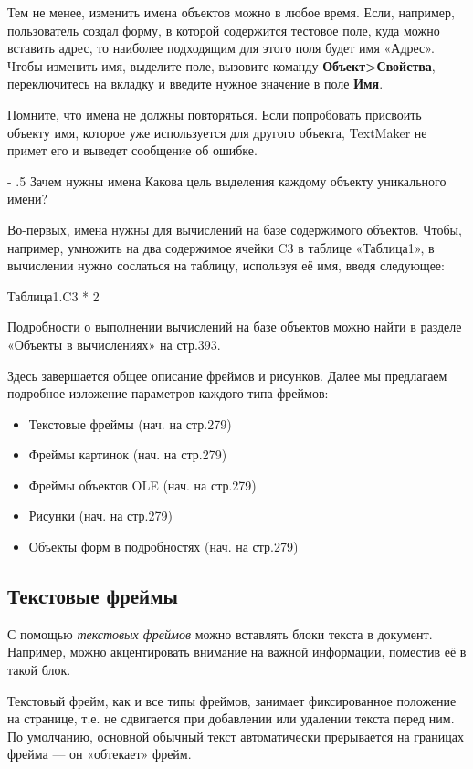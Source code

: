 ﻿\documentclass[a4paper,10pt]{article}
\makeatletter
\renewcommand\paragraph{%
   \@startsection{paragraph}{4}{0mm}%
      {-\baselineskip}%
      {.5\baselineskip}%
      {\normalfont\normalsize\bfseries}}
\makeatother
\begin{document}
Тем не менее, изменить имена объектов можно в любое время. Если, например, пользователь создал форму, в которой содержится тестовое поле, куда можно вставить адрес, то наиболее подходящим для этого поля будет имя «Адрес». Чтобы изменить имя, выделите поле, вызовите команду \textbf{Объект>Свойства}, переключитесь на вкладку и введите нужное значение в поле \textbf{Имя}.

Помните, что имена не должны повторяться. Если попробовать присвоить объекту имя, которое уже используется для другого объекта, TextMaker не примет его и выведет сообщение об ошибке.

\paragraph{Зачем нужны имена}
Какова цель выделения каждому объекту уникального имени? 

Во-первых, имена нужны для вычислений на базе содержимого объектов. Чтобы, например, умножить на два содержимое ячейки C3 в таблице «Таблица1», в вычислении нужно сослаться на таблицу, используя её имя, введя следующее:

Таблица1.C3 * 2

Подробности о выполнении вычислений на базе объектов можно найти в разделе «Объекты в вычислениях» на стр.393.

Здесь завершается общее описание фреймов и рисунков. Далее мы предлагаем подробное изложение параметров каждого типа фреймов:

\begin{itemize}
 \item Текстовые фреймы (нач. на стр.279)
 \item Фреймы картинок (нач. на стр.279)
 \item Фреймы объектов OLE (нач. на стр.279)
 \item Рисунки (нач. на стр.279)
 \item Объекты форм в подробностях (нач. на стр.279)
\end{itemize}

\subsection{Текстовые фреймы}
С помощью \textit{текстовых фреймов} можно вставлять блоки текста в документ. Например, можно акцентировать внимание на важной информации, поместив её в такой блок.

Текстовый фрейм, как и все типы фреймов, занимает фиксированное положение на странице, т.е. не сдвигается при добавлении или удалении текста перед ним. По умолчанию, основной обычный текст автоматически прерывается на границах фрейма — он «обтекает» фрейм.
\end{document}
